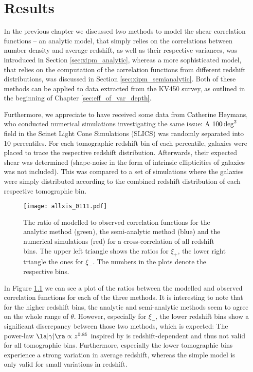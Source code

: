 \chapter{Results}
\label{sec:results}
In the previous chapter we discussed two methods to model the shear correlation functions -- an analytic model, that simply relies on the correlations between number density and average redshift, as well as their respective variances, was introduced in Section \ref{sec:xipm_analytic}, whereas a more sophisticated model, that relies on the computation of the correlation functions from different redshift distributions, was discussed in Section \ref{sec:xipm_semianalytic}. Both of these methods can be applied to data extracted from the KV450 survey, as outlined in the beginning of Chapter \ref{sec:eff_of_var_depth}. 

Furthermore, we appreciate to have received some data from Catherine Heymans, who conducted numerical simulations investigating the same issue: A $100\,\rm{deg}^2$ field in the Scinet Light Cone Simulations (SLICS) \citep{2018MNRAS.481.1337H} was randomly separated into 10 percentiles. For each tomographic redshift bin of each percentile, galaxies were placed to trace the respective redshift distribution. Afterwards, their expected shear was determined (shape-noise in the form of intrinsic ellipticities of galaxies was not included). This was compared to a set of simulations where the galaxies were simply distributed according to the combined redshift distribution of each respective tomographic bin.

	\begin{figure}
	\centering
	\texttt{[image: allxis\_0111.pdf]}
	\caption[The ratio of modelled to observed correlation functions]{The ratio of modelled to observed correlation functions for the analytic method (green), the semi-analytic method (blue) and the numerical simulations (red) for a cross-correlation of all redshift bins. The upper left triangle shows the ratios for $\xi_+$, the lower right triangle the ones for $\xi_-$. The numbers in the plots denote the respective bins.}
	\label{fig:all_xis}
	\end{figure}
	
In Figure \ref{fig:all_xis} we can see a plot of the ratios between the modelled and observed correlation functions for each of the three methods. It is interesting to note that for the higher redshift bins, the analytic and semi-analytic methods seem to agree on the whole range of $\theta$. However, especially for $\xi_-$, the lower redshift bins show a significant discrepancy between those two methods, which is expected: The power-law $
\la |\gamma|\ra \propto z^{0.85}
$
inspired by \citet{2006APh....26...91V} is redshift-dependent and thus not valid for all tomographic bins. Furthermore, especially the lower tomographic bins experience a strong variation in average redshift, whereas the simple model is only valid for small variations in redshift.

